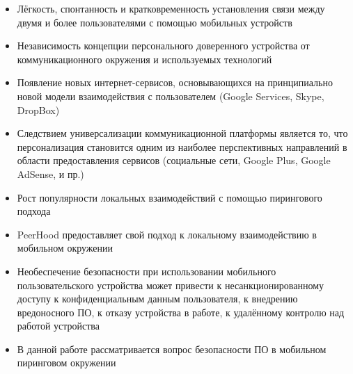 \begin{remarks}
\begin{itemize}
		\item Лёгкость, спонтанность и кратковременность установления связи между двумя и более
			пользователями с помощью мобильных устройств
		\item Независимость концепции персонального доверенного устройства от коммуникационного 
			окружения и используемых технологий
		\item Появление новых интернет-сервисов, основывающихся на принципиально новой модели 
			взаимодействия с пользователем (Google Services, Skype, DropBox)
		\item Следствием универсализации коммуникационной платформы является то, что персонализация
			становится одним из наиболее перспективных направлений в области предоставления сервисов
			(социальные сети, Google Plus, Google AdSense, и пр.)
		\item Рост популярности локальных взаимодействий с помощью пирингового подхода
		\item PeerHood предоставляет свой подход к локальному взаимодействию в мобильном окружении
		\item Необеспечение безопасности при использовании мобильного пользовательского устройства
			может привести к несанкционированному доступу к конфиденциальным данным пользователя,
			к внедрению вредоносного ПО, к отказу устройства в работе, к удалённому контролю над
			работой устройства
		\item В данной работе рассматривается вопрос безопасности ПО в мобильном пиринговом окружении
	\end{itemize}
\end{remarks}